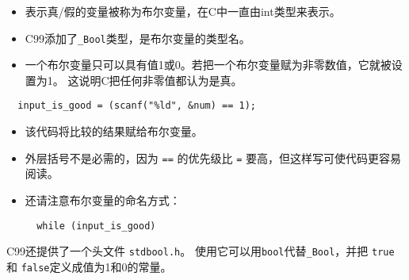 \begin{frame}[fragile]
\begin{itemize}
\item 表示真/假的变量被称为布尔变量，在C中一直由int类型来表示。\\[0.1in]
\item C99添加了\lstinline|_Bool|类型，是布尔变量的类型名。
\\[0.1in]
\item 一个布尔变量只可以具有值1或0。若把一个布尔变量赋为非零数值，它就被设置为1。
  这说明C把任何非零值都认为是真。
\end{itemize}

\end{frame}


\begin{frame}

\end{frame}


\begin{frame}[fragile]
\begin{lstlisting}
  input_is_good = (scanf("%ld", &num) == 1);
\end{lstlisting}

\begin{itemize}
\item 该代码将比较的结果赋给布尔变量。\\[0.1in]
\item 外层括号不是必需的，因为 \lstinline|==| 的优先级比 \lstinline|=| 要高，但这样写可使代码更容易阅读。
\\[0.1in]
\item 还请注意布尔变量的命名方式：
\begin{lstlisting}
  while (input_is_good)
\end{lstlisting}
\end{itemize}

\end{frame}

\begin{frame}[fragile]
  C99还提供了一个头文件 \lstinline|stdbool.h|。
  使用它可以用\lstinline|bool|代替\lstinline|_Bool|，并把 \lstinline|true| 和 \lstinline|false|定义成值为1和0的常量。
\end{frame}

\begin{frame}

\end{frame}


